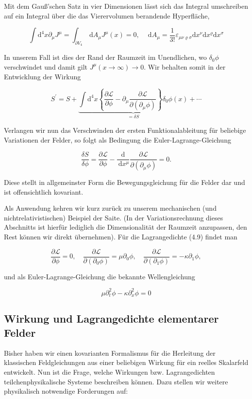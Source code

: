 \documentclass[10pt, letterpaper]{article}
\begin{document}
Mit dem Gauß'schen Satz in vier Dimensionen lässt sich das Integral umschreiben auf ein Integral über die das Vierervolumen berandende Hyperfläche,

$$
\int \mathrm{d}^{4} x \partial_{\mu} J^{\mu}=\int_{\partial V_{4}} \mathrm{~d} A_{\mu} J^{\mu}(x)=0, \quad \mathrm{~d} A_{\mu}=\frac{1}{3!} \varepsilon_{\mu \nu \varrho \sigma} \mathrm{d} x^{\nu} \mathrm{d} x^{\varrho} \mathrm{d} x^{\sigma}
$$

In unserem Fall ist dies der Rand der Raumzeit im Unendlichen, wo $\delta_{0} \phi$ verschwindet und damit gilt $J^{\mu}(x \rightarrow \infty) \rightarrow 0$. Wir behalten somit in der Entwicklung der Wirkung

$$
S^{\prime}=S+\underbrace{\int \mathrm{d}^{4} x\left\{\frac{\partial \mathscr{L}}{\partial \phi}-\partial_{\mu} \frac{\partial \mathscr{L}}{\partial\left(\partial_{\mu} \phi\right)}\right\} \delta_{0} \phi(x)}_{=\delta S}+\cdots
$$

Verlangen wir nun das Verschwinden der ersten Funktionalableitung für beliebige Variationen der Felder, so folgt als Bedingung die Euler-Lagrange-Gleichung

$$
\frac{\delta S}{\delta \phi}=\frac{\partial \mathscr{L}}{\partial \phi}-\frac{\mathrm{d}}{\mathrm{~d} x^{\mu}} \frac{\partial \mathscr{L}}{\partial\left(\partial_{\mu} \phi\right)}=0 .
$$

Diese stellt in allgemeinster Form die Bewegungsgleichung für die Felder dar und ist offensichtlich kovariant.

Als Anwendung kehren wir kurz zurück zu unserem mechanischen (und nichtrelativistischen) Beispiel der Saite. (In der Variationsrechnung dieses Abschnitts ist hierfür lediglich die Dimensionalität der Raumzeit anzupassen, den Rest können wir direkt übernehmen). Für die Lagrangedichte (4.9) findet man

$$
\frac{\partial \mathscr{L}}{\partial \phi}=0, \quad \frac{\partial \mathscr{L}}{\partial\left(\partial_{0} \phi\right)}=\mu \partial_{0} \phi, \quad \frac{\partial \mathscr{L}}{\partial\left(\partial_{1} \phi\right)}=-\kappa \partial_{1} \phi,
$$

und als Euler-Lagrange-Gleichung die bekannte Wellengleichung

$$
\mu \partial_{t}^{2} \phi-\kappa \partial_{x}^{2} \phi=0
$$

\pagebreak

\subsection{Wirkung und Lagrangedichte elementarer Felder}
Bisher haben wir einen kovarianten Formalismus für die Herleitung der klassischen Feldgleichungen aus einer beliebigen Wirkung für ein reelles Skalarfeld entwickelt. Nun ist die Frage, welche Wirkungen bzw. Lagrangedichten teilchenphysikalische Systeme beschreiben können. Dazu stellen wir weitere physikalisch notwendige Forderungen auf:
\end{document}
